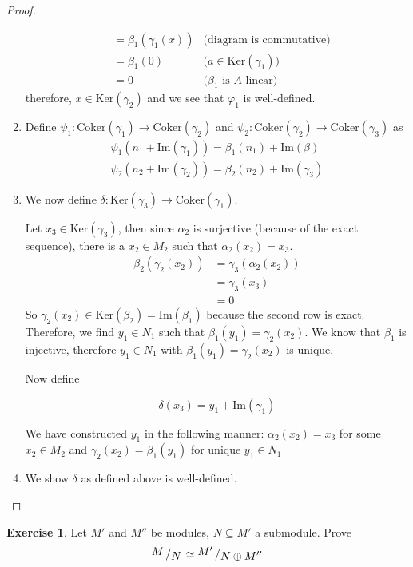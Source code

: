 \documentclass{book}
\theoremstyle{plain}
\theoremstyle{definition}
\newtheorem{exr}[thm]{Exercise}
\theoremstyle{custom_definition}
\newcommand{\Ker}[1]{ \mathrm{Ker} \left( #1 \right) }
\newcommand{\Coker}[1]{ \mathrm{Coker} \left( #1 \right) }
\newcommand{\Imag}[1]{ \mathrm{Im} \left( #1 \right)}
\newcommand{\bigslant}[2]{{\raisebox{.2em}{$#1$}\left/\raisebox{-.2em}{$#2$}\right.}}
\begin{document}
\begin{proof}
\begin{enumerate}
\begin{align}
      &= \beta_1(\gamma_1(x)) & \text{(diagram is commutative)} \\
      &= \beta_1(0) & \text{(\(a \in \Ker{\gamma_1})\)} \\
      &= 0 & \text{(\(\beta_1\) is \(A\)-linear)}
    \end{align}
    therefore, \(x \in \Ker{\gamma_2}\) and we see that \(\varphi_1\) is well-defined.
    \item Define \(\psi_1: \Coker{\gamma_1} \longrightarrow \Coker{\gamma_2}\) and \(\psi_2: \Coker{\gamma_2} \longrightarrow \Coker{\gamma_3}\) as
    \begin{align}
      \psi_1(n_1 + \Imag{\gamma_1}) = \beta_1(n_1) + \Imag{\beta} \\
      \psi_2(n_2 + \Imag{\gamma_2}) = \beta_2(n_2) + \Imag{\gamma_3}
    \end{align}
    \item We now define \(\delta: \Ker{\gamma_3} \longrightarrow \Coker{\gamma_1}\).
    
    Let \(x_3 \in \Ker{\gamma_3}\), then since \(\alpha_2\) is surjective (because of the exact sequence), there is a \(x_2 \in M_2\) such that \(\alpha_2(x_2) = x_3\).
    \begin{align}
      \beta_2(\gamma_2(x_2)) &= \gamma_3(\alpha_2(x_2)) \\
      &= \gamma_3(x_3) \\
      &= 0
    \end{align}
    So \(\gamma_2(x_2) \in \Ker{\beta_2} = \Imag{\beta_1}\) because the second row is exact. Therefore, we find \(y_1 \in N_1\) such that \(\beta_1(y_1) = \gamma_2(x_2)\). We know that \(\beta_1\) is injective, therefore \(y_1 \in N_1\) with \(\beta_1(y_1) = \gamma_2(x_2)\) is unique.

    Now define

    \begin{equation}
      \delta(x_3) = y_1 + \Imag{\gamma_1}
    \end{equation}

    We have constructed \(y_1\) in the following manner: \(\alpha_2(x_2) = x_3\) for some \(x_2 \in M_2\) and \(\gamma_2(x_2) = \beta_1(y_1)\) for unique \(y_1 \in N_1\)
    \item We show \(\delta\) as defined above is well-defined.
  \end{enumerate}
\end{proof}



\begin{exr}
  Let \(M'\) and \(M''\) be modules, \(N \subseteq M'\) a submodule. Prove
  \begin{equation}
    \bigslant{M}{N} \simeq \bigslant{M'}{N \oplus M''}
  \end{equation}
\end{exr}
\end{document}
